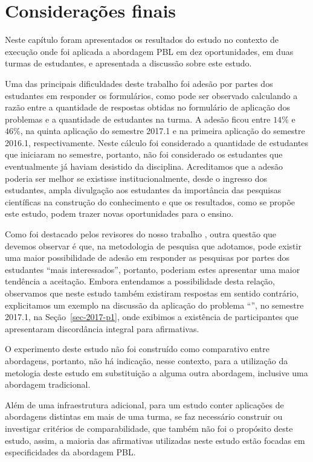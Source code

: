 \section{Considerações finais}
\label{sec-consideracoes-resultados}
Neste capítulo foram apresentados os resultados do estudo no contexto de execução onde foi aplicada a
abordagem \ac{PBL} em dez oportunidades, em duas turmas de estudantes, e apresentada a discussão
sobre este estudo.

Uma das principais dificuldades deste trabalho foi adesão
por partes dos estudantes em responder os formulários,
como pode ser observado calculando a razão entre
a quantidade de respostas obtidas no formulário de
aplicação dos problemas e a quantidade de estudantes
na turma.
A adesão ficou entre $14\%$ e $46\%$, na
quinta aplicação do semestre 2017.1 e na primeira
aplicação do semestre 2016.1, respectivamente.
Neste cálculo foi considerado a quantidade de estudantes
que iniciaram no semestre, portanto, não foi considerado os
estudantes que eventualmente já haviam desistido
da disciplina.
Acreditamos que a adesão poderia ser melhor se existisse
institucionalmente, desde o ingresso dos estudantes,
ampla divulgação aos estudantes da importância das pesquisas
científicas na construção do conhecimento e que os resultados,
como se propõe este estudo, podem trazer novas oportunidades
para o ensino.

Como foi destacado pelos revisores do nosso trabalho ,
outra questão que devemos observar é que, na metodologia de pesquisa
que adotamos, pode existir uma maior possibilidade
de adesão em responder as pesquisas por partes
dos estudantes ``mais interessados'', portanto, poderiam
estes apresentar uma maior tendência a aceitação.
Embora entendamos a possibilidade desta relação, observamos que
neste estudo também existiram respostas em sentido
contrário, explicitamos um exemplo na discussão da
aplicação do problema ``\ProblemaG'', no semestre 2017.1,
na Seção~\ref{sec-2017-p1}, onde exibimos a existência
de participantes que apresentaram discordância integral
para afirmativas.

O experimento deste estudo não foi construído como comparativo
entre abordagens, portanto, não há indicação, nesse
contexto, para a utilização da metologia deste estudo
em substituição a alguma outra abordagem, inclusive uma
abordagem tradicional.

Além de uma infraestrutura adicional, para um estudo conter
aplicações de abordagens distintas em mais de uma turma,
se faz necessário construir ou investigar critérios de
comparabilidade, que também não foi o propósito deste estudo,
assim, a maioria das afirmativas utilizadas neste estudo
estão focadas em especificidades da abordagem \ac{PBL}.

